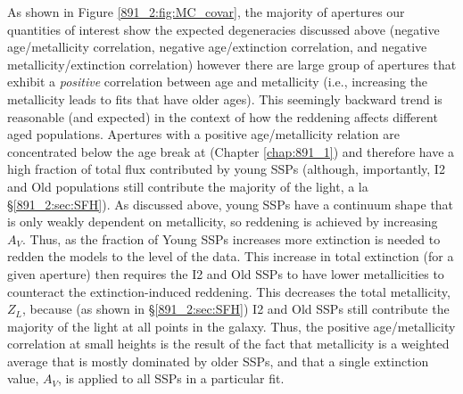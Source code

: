 As shown in Figure \ref{891_2:fig:MC_covar}, the majority of apertures
our quantities of interest show the expected degeneracies discussed
above (negative age/metallicity correlation, negative age/extinction
correlation, and negative metallicity/extinction correlation) however
there are large group of apertures that exhibit a \emph{positive}
correlation between age and metallicity (i.e., increasing the
metallicity leads to fits that have older ages). This seemingly
backward trend is reasonable (and expected) in the context of how the
reddening affects different aged populations. Apertures with a
positive age/metallicity relation are concentrated below the age break
at  (Chapter \ref{chap:891_1}) and therefore have a high
fraction of total flux contributed by young SSPs (although,
importantly, I2 and Old populations still contribute the majority of
the light, a la \S\ref{891_2:sec:SFH}). As discussed above, young SSPs
have a continuum shape that is only weakly dependent on metallicity,
so reddening is achieved by increasing $A_V$. Thus, as the fraction of
Young SSPs increases more extinction is needed to redden the models to
the level of the data. This increase in total extinction (for a given
aperture) then requires the I2 and Old SSPs to have lower
metallicities to counteract the extinction-induced reddening. This
decreases the total metallicity, $Z_L$, because (as shown in
\S\ref{891_2:sec:SFH}) I2 and Old SSPs still contribute the majority
of the light at all points in the galaxy. Thus, the positive
age/metallicity correlation at small heights is the result of the fact
that metallicity is a weighted average that is mostly dominated by
older SSPs, and that a single extinction value, $A_V$, is applied to
all SSPs in a particular fit.





